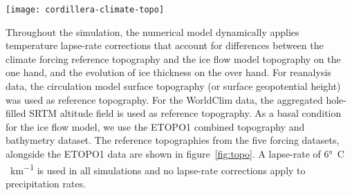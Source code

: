 \begin{figure*}[t]
	\vspace*{2mm}
	\begin{center}
		\texttt{[image: cordillera-climate-topo]}
	\end{center}
	\caption{Reference topography used for temperature lapse-rate corrections from the five climate datasets used in the study and ETOPO1 topography used as basal condition for the ice flow model.}
	\label{fig:topo}
\end{figure*}

Throughout the simulation, the numerical model dynamically applies temperature lapse-rate corrections that account for differences between the climate forcing reference topography and the ice flow model topography on the one hand, and the evolution of ice thickness on the over hand. For reanalysis data, the circulation model surface topography (or surface geopotential height) was used as reference topography. For the WorldClim data, the aggregated hole-filled SRTM altitude field is used as reference topography. As a basal condition for the ice flow model, we use the ETOPO1\citep{data:etopo1} combined topography and bathymetry dataset. The reference topographies from the five forcing datasets, alongside the ETOPO1 data are shown in figure~\ref{fig:topo}. A lapse-rate of 6\unit{\degree C\,km^{-1}} is used in all simulations and no lapse-rate corrections apply to precipitation rates.

